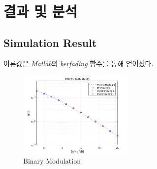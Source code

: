 \documentclass{article}
\begin{document}
\section{결과 및 분석}
\subsection{Simulation Result}
이론값은 \textsl{Matlab}의 \textsl{berfading} 함수를 통해 얻어졌다.
\begin{figure}[H]
	\centerline{\includegraphics[width=0.5\textwidth]{binary.png}}
	\caption{Binary Modulation}
\end{figure}
\end{document}
